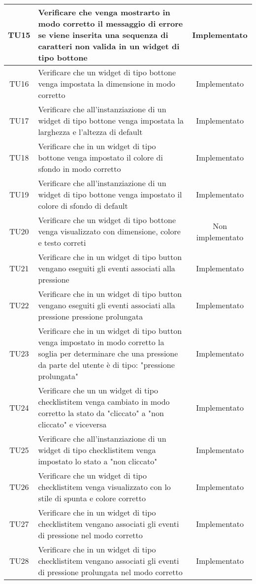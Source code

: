 \begin{center}
\begin{longtable}{|c|>{\centering}m{10cm}|c|}
		TU15 & Verificare che venga mostrarto in modo corretto il messaggio di errore se viene inserita una sequenza di caratteri non valida in un widget di tipo bottone & Implementato \\ \hline
		TU16 & Verificare che un widget di tipo bottone venga impostata la dimensione in modo corretto & Implementato \\ \hline
		TU17 & Verificare che all'instanziazione di un widget di tipo bottone venga impostata la larghezza e l'altezza di default & Implementato \\ \hline
		TU18 & Verificare che in un widget di tipo bottone venga impostato il colore di sfondo in modo corretto & Implementato \\ \hline
		TU19 & Verificare che all'instanziazione di un widget di tipo bottone venga impostato il colore di sfondo di default & Implementato \\ \hline
		TU20 & Verificare che un widget di tipo bottone venga visualizzato con dimensione, colore e testo correti & Non implementato \\ \hline
		TU21 & Verificare che in un widget di tipo button vengano eseguiti gli eventi associati alla pressione & Implementato \\ \hline
		TU22 & Verificare che in un widget di tipo button vengano eseguiti gli eventi associati alla pressione pressione prolungata & Implementato \\ \hline
		TU23 & Verificare che in un widget di tipo button venga impostato in modo corretto la soglia per determinare che una pressione da parte del utente è di tipo: "pressione prolungata" & Implementato \\ \hline
		TU24 & Verificare che un un widget di tipo checklistitem venga cambiato in modo corretto la stato da "cliccato" a "non cliccato" e viceversa & Implementato \\ \hline
		TU25 & Verificare che all'instanziazione di un widget di tipo checklistitem venga impostato lo stato a "non cliccato" & Implementato \\ \hline
		TU26 & Verificare che un widget di tipo checklistitem venga visualizzato con lo stile di spunta e colore corretto & Implementato \\ \hline
		TU27 & Verificare che in un widget di tipo checklistitem vengano associati gli eventi di pressione nel modo corretto & Implementato \\ \hline
		TU28 & Verificare che in un widget di tipo checklistitem vengano associati gli eventi di pressione prolungata nel modo corretto & Implementato \\ \hline

\end{longtable}
\end{center}
